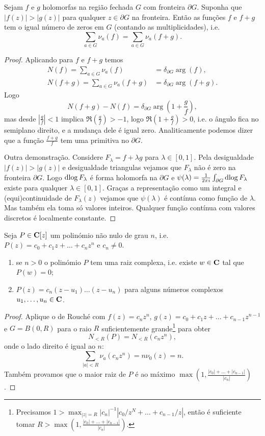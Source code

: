 \begin{teorema}[Rouché]
\label{t:rouche}
Sejam $f$ e $g$ holomorfas na região fechada $G$ com fronteira $\partial G$.
Suponha que $|f(z)| > |g(z)|$ para qualquer $z\in\partial G$ na fronteira.
Então as funções $f$ e $f+g$ tem o igual número de zeros em $G$ (contando as multiplicidades), i.e.
\[ \sum_{a\in G} \nu_a(f) = \sum_{a\in G} \nu_a(f+g) .\]
\end{teorema}
\begin{proof}
Aplicando  para $f$ e $f+g$ temos
\begin{align*}
N(f) = \sum_{a\in G} \nu_a(f)   &= \delta_{\partial G} \arg(f),\\
N(f+g) =\sum_{a\in G} \nu_a(f+g) &= \delta_{\partial G} \arg(f+g).
\end{align*}
Logo
\[ N(f+g)-N(f) = \delta_{\partial G} \arg(1+\frac{g}{f}), \]
mas desde $|\frac{g}{f}| < 1$ implica $\Re(\frac{g}{f})>-1$,
logo $\Re(1+\frac{g}{f}) > 0$, i.e. o ângulo fica no semiplano direito,
e a mudança dele é igual zero. Analiticamente podemos dizer que a função $\frac{f+g}{f}$
tem uma primitiva no $\partial G$.

Outra demonstração. Considere $F_\lambda = f + \lambda g$ para $\lambda\in[0,1]$.
Pela desigualdade $|f(z)| > |g(z)|$ e desigualdade triangulas
vejamos que $F_\lambda$ não é zero na fronteira $\partial G$.
Logo $\operatorname{dlog} F_\lambda$ é forma holomorfa na $\partial G$
e $\psi(\lambda) = \frac{1}{2\pi i} \int_{\partial G} \operatorname{dlog} F_\lambda$ existe para qualquer $\lambda\in[0,1]$.
Graças a representação como um integral e (equi)continuidade de $F_\lambda(z)$
vejamos que $\psi(\lambda)$ é contínua como função de $\lambda$. Mas também ela toma só valores inteiros.
Qualquer função contínua com valores discretos é localmente constante.
\end{proof}

\begin{cor}
\label{teorema-fundamental-algebra}
Seja $P\in\mathbf{C}[z]$ um polinómio não nulo de grau $n$, i.e.
$P(z) = c_0 + c_1 z + \dots + c_n z^n$ e $c_n\neq 0$.
\begin{enumerate}
\item se $n>0$ o polinómio $P$ tem uma raiz complexa,
i.e. existe $w\in\mathbf{C}$ tal que $P(w) = 0$;
\item $P(z) = c_n (z-u_1) \dots (z-u_n)$ para alguns números complexos $u_1,\dots,u_n\in\mathbf{C}$.
\end{enumerate}
\end{cor}
\begin{proof}
Aplique o  de Rouché com $f(z) = c_n z^n$,
$g(z) = c_0 + c_1 z + \dots + c_{n-1} z^{n-1}$ e $G = B(0,R)$
para o raio $R$ suficientemente grande\footnote{Precisamos
$1 > \max_{|z|=R} |c_n|^{-1} |c_0/z^N + \dots + c_{n-1}/z|$,
então é suficiente tomar $R>\max(1,\frac{|c_0|+\dots+|c_{n-1}|}{|c_n|})$.}
para obter
\[ N_{<R}(P) = N_{<R}(c_n z^n), \]
onde o lado direito é igual ao $n$:
\[ \sum_{|a|<R} \nu_a(c_n z^n) = n \nu_0(z) = n. \]
Também provamos que o maior raiz de $P$ é ao máximo $\max(1,\frac{|c_0|+\dots+|c_{n-1}|}{|c_n|})$.
\end{proof}

